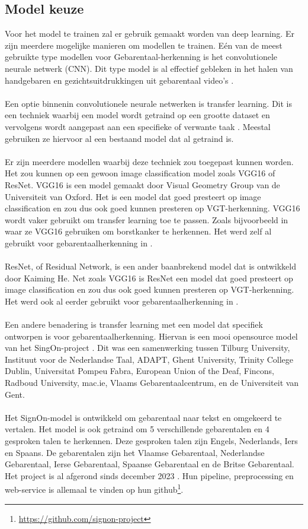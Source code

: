 \subsection{Model keuze}
\label{subsec:modeltraining}
Voor het model te trainen zal er gebruik gemaakt worden van deep learning.
Er zijn meerdere mogelijke manieren om modellen te trainen. 
E{\'e}n van de meest gebruikte type modellen voor Gebarentaal-herkenning is het convolutionele neurale netwerk (CNN).
Dit type model is al effectief gebleken in het halen van handgebaren en gezichtsuitdrukkingen uit gebarentaal video's \autocite{10.17485/ijst/v16i45.2583}.
\\
\\
Een optie binnenin convolutionele neurale netwerken is transfer learning.
Dit is een techniek waarbij een model wordt getraind op een grootte dataset en vervolgens wordt aangepast aan een specifieke of verwante taak \autocite{torrey2010transfer}.
Meestal gebruiken ze hiervoor al een bestaand model dat al getraind is.
\\
\\
Er zijn meerdere modellen waarbij deze techniek zou toegepast kunnen worden.
Het zou kunnen op een gewoon image classification model zoals VGG16 of ResNet.
VGG16 is een model gemaakt door Visual Geometry Group van de Universiteit van Oxford.
Het is een model dat goed presteert op image classification en zou dus ook goed kunnen presteren op VGT-herkenning.
VGG16 wordt vaker gebruikt om transfer learning toe te passen.
Zoals bijvoorbeeld in \textcite{9491631} waar ze VGG16 gebruiken om borstkanker te herkennen.
Het werd zelf al gebruikt voor gebarentaalherkenning in \textcite{Abu-Jamie2022-ABUCOS-2}.
\\
\\
ResNet, of Residual Network, is een ander baanbrekend model dat is ontwikkeld door Kaiming He.
Net zoals VGG16 is ResNet een model dat goed presteert op image classification en zou dus ook goed kunnen presteren op VGT-herkenning.
Het werd ook al eerder gebruikt voor gebarentaalherkenning in \textcite{Wang2022}.
\\
\\
Een andere benadering is transfer learning met een model dat specifiek ontworpen is voor gebarentaalherkenning.
Hiervan is een mooi opensource model van het SingOn-project \autocite{SingOn}. 
Dit was een samenwerking tussen Tilburg University, Instituut voor de Nederlandse Taal, ADAPT, Ghent University, Trinity College Dublin, Universitat Pompeu Fabra, European Union of the Deaf, Fincons, Radboud University, mac.ie, Vlaams Gebarentaalcentrum, en de Universiteit van Gent.
\\
\\
Het SignOn-model is ontwikkeld om gebarentaal naar tekst en omgekeerd te vertalen.
Het model is ook getraind om 5 verschillende gebarentalen en 4 gesproken talen te herkennen.
Deze gesproken talen zijn Engels, Nederlands, Iers en Spaans.
De gebarentalen zijn het Vlaamse Gebarentaal, Nederlandse Gebarentaal, Ierse Gebarentaal, Spaanse Gebarentaal en de Britse Gebarentaal.
Het project is al afgerond sinds december 2023 \autocite{shterionov-etal-2024-signon}.
Hun pipeline, preprocessing en web-service is allemaal te vinden op hun github\footnote{\url{https://github.com/signon-project}}.

